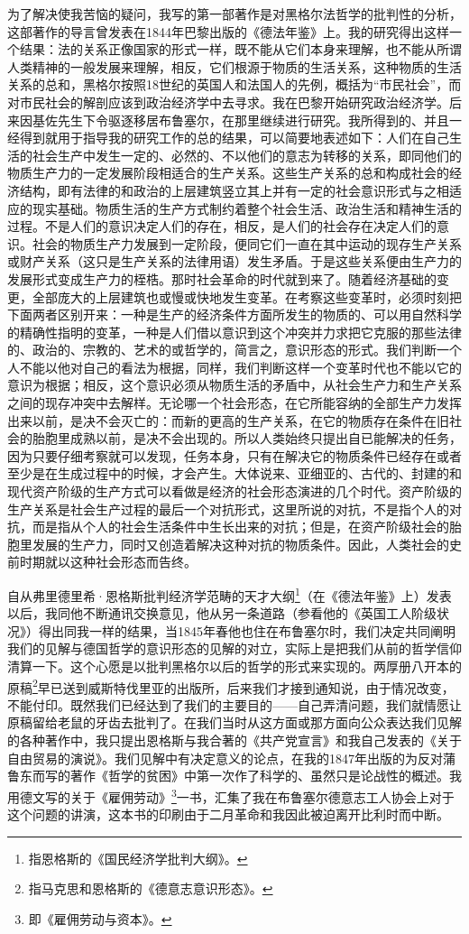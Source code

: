 \documentclass[a4paper,twoside,12pt,AutoFakeBold]{ctexart}
\begin{document}
为了解决使我苦恼的疑问，我写的第一部著作是对黑格尔法哲学的批判性的分析，这部著作的导言曾发表在1844年巴黎出版的《德法年鉴》上。我的研究得出这样一个结果：法的关系正像国家的形式一样，既不能从它们本身来理解，也不能从所谓人类精神的一般发展来理解，相反，它们根源于物质的生活关系，这种物质的生活关系的总和，黑格尔按照18世纪的英国人和法国人的先例，概括为“市民社会”，而对市民社会的解剖应该到政治经济学中去寻求。我在巴黎开始研究政治经济学。后来因基佐先生下令驱逐移居布鲁塞尔，在那里继续进行研究。我所得到的、并且一经得到就用于指导我的研究工作的总的结果，可以简要地表述如下：人们在自己生活的社会生产中发生一定的、必然的、不以他们的意志为转移的关系，即同他们的物质生产力的一定发展阶段相适合的生产关系。这些生产关系的总和构成社会的经济结构，即有法律的和政治的上层建筑竖立其上并有一定的社会意识形式与之相适应的现实基础。物质生活的生产方式制约着整个社会生活、政治生活和精神生活的过程。不是人们的意识决定人们的存在，相反，是人们的社会存在决定人们的意识。社会的物质生产力发展到一定阶段，便同它们一直在其中运动的现存生产关系或财产关系（这只是生产关系的法律用语）发生矛盾。于是这些关系便由生产力的发展形式变成生产力的桎梏。那时社会革命的时代就到来了。随着经济基础的变更，全部庞大的上层建筑也或慢或快地发生变革。在考察这些变革时，必须时刻把下面两者区别开来：一种是生产的经济条件方面所发生的物质的、可以用自然科学的精确性指明的变革，一种是人们借以意识到这个冲突并力求把它克服的那些法律的、政治的、宗教的、艺术的或哲学的，简言之，意识形态的形式。我们判断一个人不能以他对自己的看法为根据，同样，我们判断这样一个变革时代也不能以它的意识为根据；相反，这个意识必须从物质生活的矛盾中，从社会生产力和生产关系之间的现存冲突中去解样。无论哪一个社会形态，在它所能容纳的全部生产力发挥出来以前，是决不会灭亡的：而新的更高的生产关系，在它的物质存在条件在旧社会的胎胞里成熟以前，是决不会出现的。所以人类始终只提出自已能解决的任务，因为只要仔细考察就可以发现，任务本身，只有在解决它的物质条件已经存在或者至少是在生成过程中的时候，才会产生。大体说来、亚细亚的、古代的、封建的和现代资产阶级的生产方式可以看做是经济的社会形态演进的几个时代。资产阶级的生产关系是社会生产过程的最后一个对抗形式，这里所说的对抗，不是指个人的对抗，而是指从个人的社会生活条件中生长出来的对抗；但是，在资产阶级社会的胎胞里发展的生产力，同时又创造着解决这种对抗的物质条件。因此，人类社会的史前时期就以这种社会形态而告终。

自从弗里德里希·恩格斯批判经济学范畴的天才大纲\footnote{指恩格斯的《国民经济学批判大纲》。}（在《德法年鉴》上）发表以后，我同他不断通讯交换意见，他从另一条道路（参看他的《英国工人阶级状况》）得出同我一样的结果，当1845年春他也住在布鲁塞尔时，我们决定共同阐明我们的见解与德国哲学的意识形态的见解的对立，实际上是把我们从前的哲学信仰清算一下。这个心愿是以批判黑格尔以后的哲学的形式来实现的。两厚册八开本的原稿\footnote{指马克思和恩格斯的《德意志意识形态》。}早已送到威斯特伐里亚的出版所，后来我们才接到通知说，由于情况改变，不能付印。既然我们已经达到了我们的主要目的——自己弄清问题，我们就情愿让原稿留给老鼠的牙齿去批判了。在我们当时从这方面或那方面向公众表达我们见解的各种著作中，我只提出恩格斯与我合著的《共产党宣言》和我自己发表的《关于自由贸易的演说》。我们见解中有决定意义的论点，在我的1847年出版的为反对蒲鲁东而写的著作《哲学的贫困》中第一次作了科学的、虽然只是论战性的概述。我用德文写的关于《雇佣劳动》\footnote{即《雇佣劳动与资本》。}一书，汇集了我在布鲁塞尔德意志工人协会上对于这个问题的讲演，这本书的印刷由于二月革命和我因此被迫离开比利时而中断。
\end{document}
